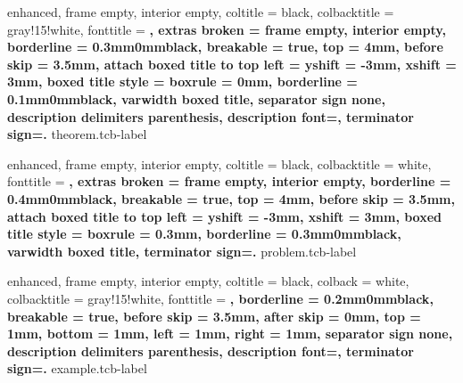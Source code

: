 \theoremstyle{definition}

\newtheorem{section-lemma}{Lema}[section]
\newtheorem{section-example}{Ejemplo}[section]
\newtheorem{section-theorem}{Teorema}[section]
\newtheorem{section-problem}{Problema}[section]
\newtheorem{section-exercise}{Ejercicio}[section]
\newtheorem{section-corollary}{Corolario}[section]
\newtheorem{section-definition}{Definición}[section]

\newtheorem{case}{Caso}
\newtheorem{example}{Ejemplo}
\newtheorem{problem}{Problema}
\newtheorem{remark}{Observación}
\newtheorem{corollary}{Corolario}

\newtheorem*{note}{Nota}
\newtheorem*{definition}{Definición}


{
    enhanced,
    frame empty,
    interior empty,
    coltitle = black,
    colbacktitle = gray!15!white,
    fonttitle = \bfseries,
    extras broken = {frame empty, interior empty},
    borderline = {0.3mm}{0mm}{black},
    breakable = true,
    top = 4mm,
    before skip = 3.5mm,
    attach boxed title to top left = {yshift = -3mm, xshift = 3mm},
    boxed title style = {boxrule = 0mm, borderline = {0.1mm}{0mm}{black}},
    varwidth boxed title,
    separator sign none, description delimiters parenthesis,
    description font=\bfseries,
    terminator sign={.\hspace{1mm}}
}
{theorem.tcb-label}

{
    enhanced,
    frame empty,
    interior empty,
    coltitle = black,
    colbacktitle = white,
    fonttitle = \bfseries,
    extras broken = {frame empty, interior empty},
    borderline = {0.4mm}{0mm}{black},
    breakable = true,
    top = 4mm,
    before skip = 3.5mm,
    attach boxed title to top left = {yshift = -3mm, xshift = 3mm},
    boxed title style = {boxrule = 0.3mm, borderline = {0.3mm}{0mm}{black}},
    varwidth boxed title,
    terminator sign={.\hspace{1mm}}
}
{problem.tcb-label}

{
    enhanced,
    frame empty,
    interior empty,
    coltitle = black,
    colback = white,
    colbacktitle = gray!15!white,
    fonttitle = \bfseries,
    borderline = {0.2mm}{0mm}{black},
    breakable = true,
    before skip = 3.5mm,
    after skip = 0mm,
    top = 1mm,
    bottom = 1mm,
    left = 1mm,
    right = 1mm,
    separator sign none, description delimiters parenthesis,
    description font=\bfseries,
    terminator sign={.\hspace{1mm}}
}
{example.tcb-label}

